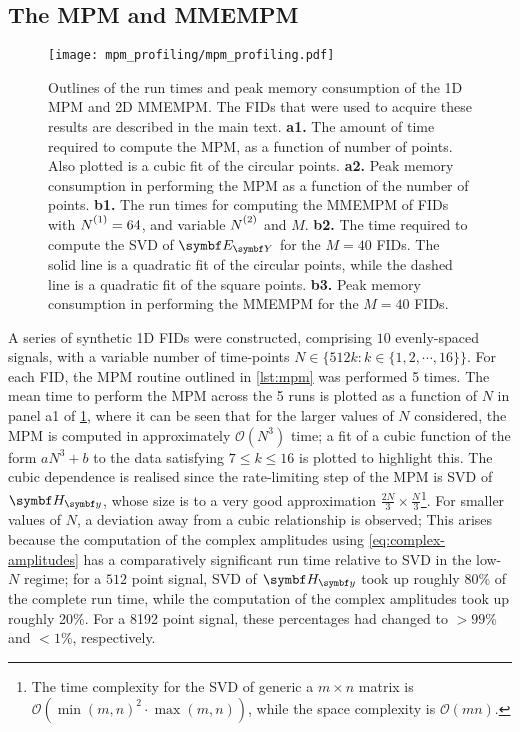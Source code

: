 \subsection{The \acs{MPM} and \acs{MMEMPM}}
\begin{figure}
    \centering
    \texttt{[image: mpm\_profiling/mpm\_profiling.pdf]}
    \caption[
        Outlines of the run times and peak memory consumption of
        the \acs{1D} \acs{MPM} and \acs{2D} \acs{MMEMPM}.
    ]
    {
        Outlines of the run times and peak memory consumption of
        the \acs{1D} \acs{MPM} and \acs{2D} \acs{MMEMPM}.
        The \acp{FID} that were used to acquire these results are described in
        the main text.
        \textbf{a1.} The amount of time required to compute the \ac{MPM}, as a
        function of number of points. Also plotted is a cubic fit of the
        circular points.
        \textbf{a2.} Peak memory consumption in performing the \ac{MPM} as a
        function of the number of points.
        \textbf{b1.} The run times for computing the \ac{MMEMPM} of
        \acp{FID} with $\None = 64$, and variable $\Ntwo$ and $M$.
        \textbf{b2.} The time required to compute the \ac{SVD} of $\EY$ for the
        $M=40$ \acp{FID}. The solid line is a quadratic fit of the circular
        points, while the dashed line is a quadratic fit of the square points.
        \textbf{b3.} Peak memory consumption in performing the \ac{MMEMPM} for
        the $M=40$ \acp{FID}.
    }
    \label{fig:mpm-profiling}
\end{figure}

A series of synthetic \ac{1D} \acp{FID} were constructed, comprising $10$ evenly-spaced
signals, with a
variable number of time-points $N \in \lbrace 512k : k \in \lbrace 1, 2, \cdots, 16 \rbrace \rbrace$.
For each \ac{FID}, the \ac{MPM} routine outlined in \cref{lst:mpm} was
performed 5 times.
The mean time to perform the \ac{MPM} across the 5 runs is plotted as a function
of $N$ in panel a1 of \cref{fig:mpm-profiling}, where it can be seen that for
the larger values of $N$ considered, the \ac{MPM} is computed in approximately
$\mathcal{O}({N}^3)$ time;
a fit of a cubic function of the form $aN^3 + b$ to the data satisfying $7 \leq
k \leq 16$ is plotted to highlight this.
The cubic dependence is realised since the rate-limiting step of the
\ac{MPM} is \ac{SVD} of $\Hy$, whose size is to a very good approximation
$\tfrac{2N}{3} \times \tfrac{N}{3}$\footnote{
    \label{fn:svd-complexity}
    The time complexity for the \ac{SVD} of generic a $m \times n$ matrix is
    $\mathcal{O}(\operatorname{min}(m, n)^2 \cdot \operatorname{max}(m, n))$,
    while the space complexity is $\mathcal{O}(mn)$.
}. For smaller values of $N$, a deviation
away from a cubic relationship is observed;
This arises because the computation of the complex amplitudes using
\cref{eq:complex-amplitudes} has a comparatively significant run time
relative to \ac{SVD} in the low-$N$ regime;
for a $512$ point signal, \ac{SVD} of $\Hy$ took up roughly 80\% of the
complete run time, while the computation of the complex amplitudes took up
roughly 20\%. For a 8192 point signal, these percentages had changed to
$>\!\!99\%$ and $<\!\!1\%$, respectively.

